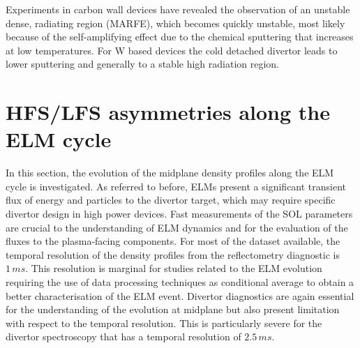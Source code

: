 \documentclass[12pt]{iopart}
\begin{document}
Experiments in carbon wall devices have revealed the observation of an unstable dense, radiating region (MARFE), which becomes quickly unstable, most likely because of the self-amplifying effect due to the chemical sputtering that increases at low temperatures. For W based devices the cold detached divertor leads to lower sputtering and generally to a stable high radiation region.

\section{HFS/LFS asymmetries along the ELM cycle}
\label{section:hfslfselmcycle}

In this section, the evolution of the midplane density profiles along the ELM cycle is investigated. As referred to before, ELMs present a significant transient flux of energy and particles to the divertor target, which may require specific divertor design in high power devices. Fast measurements of the SOL parameters are crucial to the understanding of ELM dynamics and for the evaluation of the fluxes to the plasma-facing components. For most of the dataset available, the temporal resolution of the density profiles from the reflectometry diagnostic is $1\,ms$. This resolution is marginal for studies related to the ELM evolution requiring the use of data processing techniques as conditional average to obtain a better characterisation of the ELM event. Divertor diagnostics are again essential for the understanding of the evolution at midplane but also present limitation with respect to the temporal resolution. This is particularly severe for the divertor spectroscopy that has a temporal resolution of $2.5\,ms$.
\end{document}
